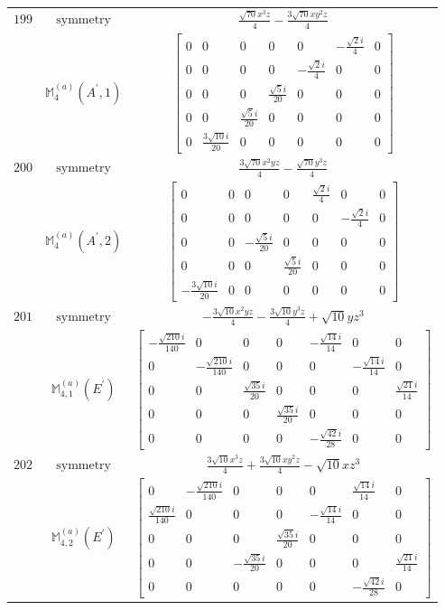 \documentclass[fleqn,8pt,landscape]{jsarticle}
\begin{document}
\begin{longtable}{ccc}
$ 199 $ & $ \text{symmetry} $ & $ \frac{\sqrt{70} x^{3} z}{4} - \frac{3 \sqrt{70} x y^{2} z}{4} $ \\
$  $ & $ \mathbb{M}_{4}^{(a)}(A^{\prime},1) $ & $ \begin{bmatrix} 0 & 0 & 0 & 0 & 0 & - \frac{\sqrt{2} i}{4} & 0 \\ 0 & 0 & 0 & 0 & - \frac{\sqrt{2} i}{4} & 0 & 0 \\ 0 & 0 & 0 & \frac{\sqrt{5} i}{20} & 0 & 0 & 0 \\ 0 & 0 & \frac{\sqrt{5} i}{20} & 0 & 0 & 0 & 0 \\ 0 & \frac{3 \sqrt{10} i}{20} & 0 & 0 & 0 & 0 & 0 \end{bmatrix} $ \\ \hline
$ 200 $ & $ \text{symmetry} $ & $ \frac{3 \sqrt{70} x^{2} y z}{4} - \frac{\sqrt{70} y^{3} z}{4} $ \\
$  $ & $ \mathbb{M}_{4}^{(a)}(A^{\prime},2) $ & $ \begin{bmatrix} 0 & 0 & 0 & 0 & \frac{\sqrt{2} i}{4} & 0 & 0 \\ 0 & 0 & 0 & 0 & 0 & - \frac{\sqrt{2} i}{4} & 0 \\ 0 & 0 & - \frac{\sqrt{5} i}{20} & 0 & 0 & 0 & 0 \\ 0 & 0 & 0 & \frac{\sqrt{5} i}{20} & 0 & 0 & 0 \\ - \frac{3 \sqrt{10} i}{20} & 0 & 0 & 0 & 0 & 0 & 0 \end{bmatrix} $ \\ \hline
$ 201 $ & $ \text{symmetry} $ & $ - \frac{3 \sqrt{10} x^{2} y z}{4} - \frac{3 \sqrt{10} y^{3} z}{4} + \sqrt{10} y z^{3} $ \\
$  $ & $ \mathbb{M}_{4,1}^{(a)}(E^{\prime}) $ & $ \begin{bmatrix} - \frac{\sqrt{210} i}{140} & 0 & 0 & 0 & - \frac{\sqrt{14} i}{14} & 0 & 0 \\ 0 & - \frac{\sqrt{210} i}{140} & 0 & 0 & 0 & - \frac{\sqrt{14} i}{14} & 0 \\ 0 & 0 & \frac{\sqrt{35} i}{20} & 0 & 0 & 0 & \frac{\sqrt{21} i}{14} \\ 0 & 0 & 0 & \frac{\sqrt{35} i}{20} & 0 & 0 & 0 \\ 0 & 0 & 0 & 0 & - \frac{\sqrt{42} i}{28} & 0 & 0 \end{bmatrix} $ \\ \hline
$ 202 $ & $ \text{symmetry} $ & $ \frac{3 \sqrt{10} x^{3} z}{4} + \frac{3 \sqrt{10} x y^{2} z}{4} - \sqrt{10} x z^{3} $ \\
$  $ & $ \mathbb{M}_{4,2}^{(a)}(E^{\prime}) $ & $ \begin{bmatrix} 0 & - \frac{\sqrt{210} i}{140} & 0 & 0 & 0 & \frac{\sqrt{14} i}{14} & 0 \\ \frac{\sqrt{210} i}{140} & 0 & 0 & 0 & - \frac{\sqrt{14} i}{14} & 0 & 0 \\ 0 & 0 & 0 & \frac{\sqrt{35} i}{20} & 0 & 0 & 0 \\ 0 & 0 & - \frac{\sqrt{35} i}{20} & 0 & 0 & 0 & \frac{\sqrt{21} i}{14} \\ 0 & 0 & 0 & 0 & 0 & - \frac{\sqrt{42} i}{28} & 0 \end{bmatrix} $ \\ \hline

\end{longtable}
\end{document}
